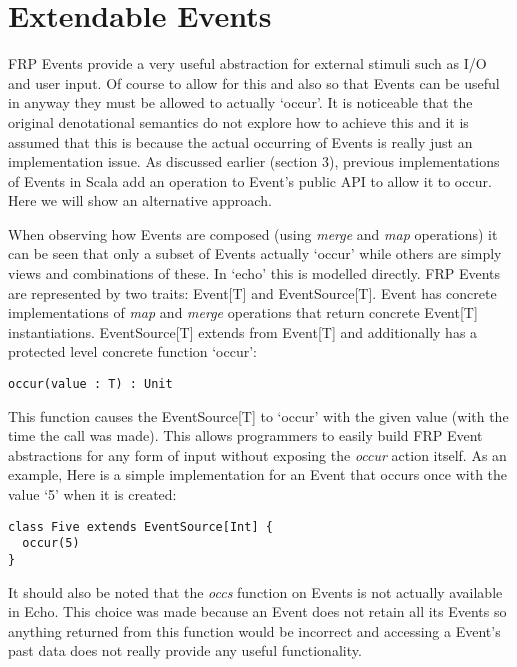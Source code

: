   \section{Extendable Events}
    FRP Events provide a very useful abstraction for external stimuli such as I/O and user input. Of course
    to allow for this and also so that Events can be useful in anyway they must be allowed to actually `occur'.
    It is noticeable that the original denotational semantics \cite{Elliott1997} do not explore how to achieve
    this and it is assumed that this is because the actual occurring of Events is really just an implementation
    issue. As discussed earlier (section 3), previous implementations of Events in Scala add an operation to Event's
    public API to allow it to occur. Here we will show an alternative approach.
    
    When observing how Events are composed (using \emph{merge} and \emph{map} operations) it can be seen that
    only a subset of Events actually `occur' while others are simply views and combinations of these.
    In `echo' this is modelled directly. FRP Events are represented by two traits: Event[T] and EventSource[T].
    Event has concrete implementations of \emph{map} and \emph{merge} operations that
    return concrete Event[T] instantiations. EventSource[T] extends
    from Event[T] and additionally has a protected level concrete function `occur':
    
\begin{verbatim}
occur(value : T) : Unit
\end{verbatim}  

    This function causes the EventSource[T] to `occur' with the given value (with the time the call was made). This allows 
    programmers
    to easily build FRP Event abstractions for any form of input without exposing the \emph{occur} action itself.
    As an example, Here is a simple implementation for an Event that occurs once with the value `5' when it 
    is created:
    
\begin{verbatim}
class Five extends EventSource[Int] {
  occur(5)
}
\end{verbatim}

    It should also be noted that the \emph{occs} function on Events is not actually available in Echo. This
    choice was made because an Event does not retain all its Events so anything returned from this 
    function would be incorrect and accessing a Event's past data does not really
    provide any useful functionality.

